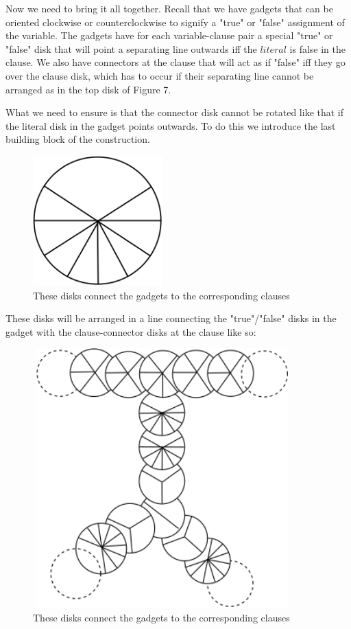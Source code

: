 \documentclass[a4paper,11pt]{article}
\begin{document}
Now we need to bring it all together. Recall that we have gadgets that can be oriented clockwise or counterclockwise to signify a "true" or "false" assignment of the variable. The gadgets have for each variable-clause pair a special "true" or "false" disk that will point a separating line outwards iff the $literal$ is false in the clause. We also have connectors at the clause that will act as if "false" iff they go over the clause disk, which has to occur if their separating line cannot be arranged as in the top disk of Figure 7.

What we need to ensure is that the connector disk cannot be rotated like that if the literal disk in the gadget points outwards. To do this we introduce the last building block of the construction.

\begin{figure}[h]
\centering
\includegraphics[width=5cm, height=5cm]{assets/np-hardness/literal_connector.png}
\caption{These disks connect the gadgets to the corresponding clauses}
\end{figure}

These disks will be arranged in a line connecting the "true"/"false" disks in the gadget with the clause-connector disks at the clause like so:

\begin{figure}[h]
\centering
\includegraphics[width=10cm, height=10cm]{assets/np-hardness/full.png}
\caption{These disks connect the gadgets to the corresponding clauses}
\end{figure}
\end{document}
